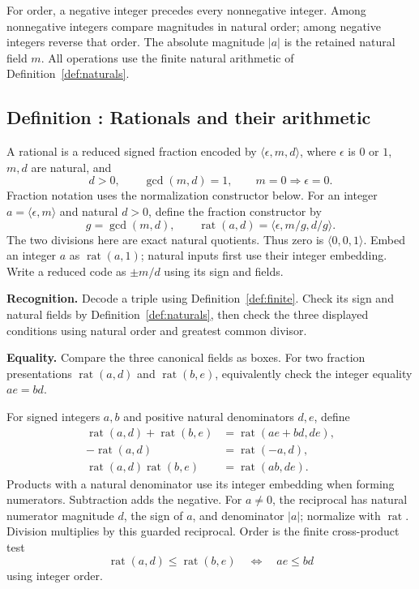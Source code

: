 \documentclass[11pt]{article}
\newcounter{definition}
\newcommand{\entry}[2]{%
  \refstepcounter{definition}\subsection*{#1 \thedefinition: #2}}
\newcommand{\definition}[1]{\entry{Definition}{#1}}
\newcommand{\checks}[2]{\begin{samepage}\par
  \textbf{Recognition.} #1\par\nopagebreak[4]
  \textbf{Equality.} #2\par\end{samepage}}
\begin{document}
For order, a negative integer precedes every nonnegative integer.
Among nonnegative integers compare magnitudes in natural order;
among negative integers reverse that order.
The absolute magnitude $|a|$ is the retained natural field $m$.
All operations use the finite natural arithmetic of
Definition~\ref{def:naturals}.

\definition{Rationals and their arithmetic}\label{def:rational-box}
A rational is a reduced signed fraction encoded by
$\langle\epsilon,m,d\rangle$, where $\epsilon$ is $0$ or $1$,
$m,d$ are natural, and
\[
          d>0,\qquad \gcd(m,d)=1,\qquad
          m=0\Longrightarrow\epsilon=0.
\]
Fraction notation uses the normalization constructor below.
For an integer $a=\langle\epsilon,m\rangle$ and natural $d>0$, define
the fraction constructor by
\[
 g=\gcd(m,d),\qquad
 \operatorname{rat}(a,d)=\langle\epsilon,m/g,d/g\rangle .
\]
The two divisions here are exact natural quotients. Thus zero is
$\langle0,0,1\rangle$. Embed an integer $a$ as $\operatorname{rat}(a,1)$;
natural inputs first use their integer embedding.
Write a reduced code as $\pm m/d$ using its sign and fields.

\checks{Decode a triple using Definition~\ref{def:finite}. Check its sign
and natural fields by Definition~\ref{def:naturals}, then check the
three displayed conditions using natural order and greatest common divisor.}
{Compare the three canonical fields as boxes. For two fraction
presentations $\operatorname{rat}(a,d)$ and $\operatorname{rat}(b,e)$,
equivalently check the integer equality $ae=bd$.}

For signed integers $a,b$ and positive natural denominators $d,e$, define
\[
\begin{aligned}
 \operatorname{rat}(a,d)+\operatorname{rat}(b,e)
     &=\operatorname{rat}(ae+bd,de),\\
 -\operatorname{rat}(a,d)&=\operatorname{rat}(-a,d),\\
 \operatorname{rat}(a,d)\operatorname{rat}(b,e)
     &=\operatorname{rat}(ab,de).
\end{aligned}
\]
Products with a natural denominator use its integer embedding when
forming numerators. Subtraction adds the negative.
For $a\ne0$, the reciprocal has natural numerator magnitude $d$, the
sign of $a$, and denominator $|a|$; normalize with
$\operatorname{rat}$. Division multiplies by this guarded reciprocal.
Order is the finite cross-product test
\[
 \operatorname{rat}(a,d)\leq\operatorname{rat}(b,e)
                         \quad\Longleftrightarrow\quad ae\leq bd
\]
using integer order.
\end{document}

